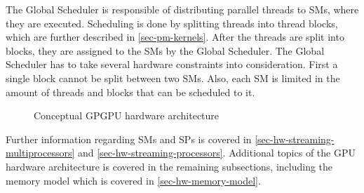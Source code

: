 The Global Scheduler is responsible of distributing parallel threads to SMs, where they are executed.
Scheduling is done by splitting threads into thread blocks, which are further described in \cref{sec-pm-kernels}.
After the threads are split into blocks, they are assigned to the SMs by the Global Scheduler.
The Global Scheduler has to take several hardware constraints into consideration.
First a single block cannot be split between two SMs.
Also, each SM is limited in the amount of threads and blocks that can be scheduled to it. 

\begin{figure}[ht]
	\centering
	\caption{Conceptual GPGPU hardware architecture}
	\label{fig:hw-gpu}
\end{figure}


Further information regarding SMs and SPs is covered in \cref{sec-hw-streaming-multiprocessors} and \cref{sec-hw-streaming-processors}.
Additional topics of the GPU hardware architecture is covered in the remaining subsections, including the memory model which is covered in \cref{sec-hw-memory-model}.